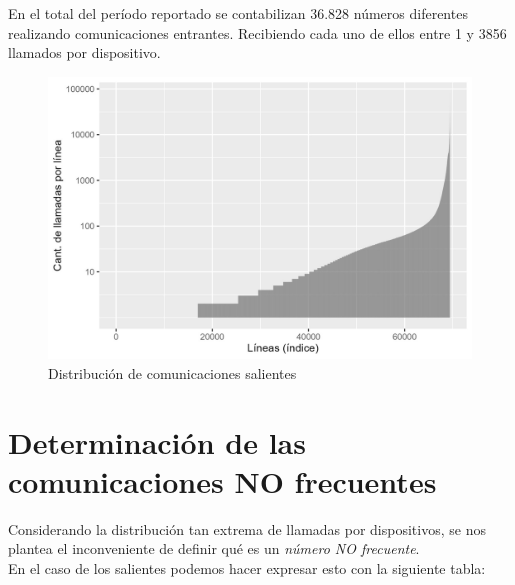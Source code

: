 \documentclass[12pt]{report}
\begin{document}
	En el total del período reportado se contabilizan 36.828 números diferentes realizando comunicaciones entrantes. Recibiendo cada uno de ellos entre 1 y 3856 llamados por dispositivo.\\
	
	\begin{figure}[h]
		\centering
		\includegraphics[width=\textwidth]{grafico_llamadas_01.jpeg}
		\caption{Distribución de comunicaciones salientes}
		\label{fig:enter-label}
	\end{figure}
	
	\section*{Determinación de las comunicaciones NO frecuentes}
	Considerando la distribución tan extrema de llamadas por dispositivos, se nos plantea el inconveniente de definir qué es un \textit{número NO frecuente}.\\
	En el caso de los salientes podemos hacer expresar esto con la siguiente tabla:\\
	
\end{document}
